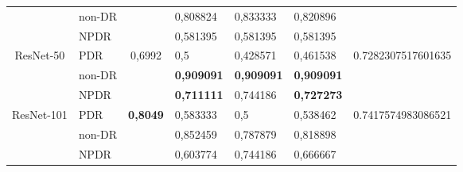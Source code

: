 \begin{table}[hbtp]
\begin{center}
\begin{tabular}{|c|l|c|l|l|l|c|}
			& non-DR                                             &                          & 0,808824                                          & 0,833333                                         & 0,820896                                        &                                      \\ \cline{2-2} \cline{4-6}
			& NPDR                                               &                          & 0,581395                                          & 0,581395                                         & 0,581395                                        &                                      \\ \cline{2-2} \cline{4-6}
			\multirow{-3}{*}{ResNet-50}  & PDR                                                & \multirow{-3}{*}{0,6992} & 0,5                                               & 0,428571                                         & 0,461538                                        & \multirow{-3}{*}{0.7282307517601635} \\ \hline
			& non-DR                                             &                          & \textbf{0,909091}                                          & \textbf{0,909091}                                         & \textbf{0,909091}                                        &                                      \\ \cline{2-2} \cline{4-6}
			& NPDR                                               &                          & \textbf{0,711111}                                          & 0,744186                                         & \textbf{0,727273}                                        &                                      \\ \cline{2-2} \cline{4-6}
			\multirow{-3}{*}{ResNet-101} & PDR                                                & \multirow{-3}{*}{\textbf{0,8049}} & 0,583333                                          & 0,5                                              & 0,538462                                        & \multirow{-3}{*}{0.7417574983086521} \\ \hline
			& non-DR                                             &                          & 0,852459                                          & 0,787879                                         & 0,818898                                        &                                      \\ \cline{2-2} \cline{4-6}
			& NPDR                                               &                          & 0,603774                                          & 0,744186                                         & 0,666667                                        &                                      \\ \cline{2-2} \cline{4-6}

\end{tabular}
\end{center}
\end{table}
